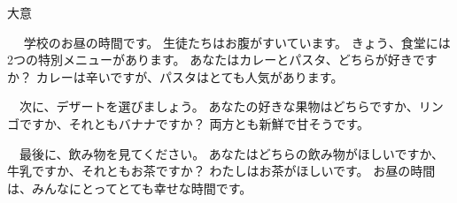\documentclass[aspectratio=169,xcolor={dvipsnames,table}]{beamer}
\begin{document}
\begin{frame}[plain]{大意}
 
\begin{tcolorbox}[title=お昼ご飯の選択]
　 学校のお昼の時間です。
生徒たちはお腹がすいています。
きょう、食堂には2つの特別メニューがあります。
あなたはカレーとパスタ、どちらが好きですか？ 
カレーは辛いですが、パスタはとても人気があります。

　次に、デザートを選びましょう。
あなたの好きな果物はどちらですか、リンゴですか、それともバナナですか？ 
両方とも新鮮で甘そうです。

　最後に、飲み物を見てください。
あなたはどちらの飲み物がほしいですか、牛乳ですか、それともお茶ですか？ 
わたしはお茶がほしいです。
お昼の時間は、みんなにとってとても幸せな時間です。
\end{tcolorbox}
\end{frame}
\end{document}
